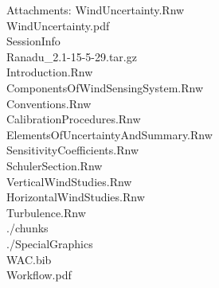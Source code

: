 \documentclass[12pt,twoside,english]{article}\usepackage[]{graphicx}\usepackage[]{color}
\newenvironment{lyxlist}[1]
{\begin{list}{}
{\settowidth{\labelwidth}{#1}
\setlength{\leftmargin}{\labelwidth}
\addtolength{\leftmargin}{\labelsep}
\renewcommand{\makelabel}[1]{##1\hfil}}}
{\end{list}}
\newcommand{\attachm}[1]{\begin{lyxlist}{Attachments:00}
\item [Attachments:] {#1}
\end{lyxlist}}
\providecommand{\DIFaddbegin}{} %
\providecommand{\DIFaddend}{} %
\providecommand{\DIFdelbegin}{} %
\providecommand{\DIFdelend}{} %
\begin{document}
\DIFdelbegin %
\DIFdelend \DIFaddbegin \attachm{WindUncertainty.Rnw\\WindUncertainty.pdf\\SessionInfo\\Ranadu\_2.1-15-5-29.tar.gz\\Introduction.Rnw\\ComponentsOfWindSensingSystem.Rnw\\Conventions.Rnw\\CalibrationProcedures.Rnw\\ElementsOfUncertaintyAndSummary.Rnw\\SensitivityCoefficients.Rnw\\SchulerSection.Rnw\\VerticalWindStudies.Rnw\\HorizontalWindStudies.Rnw\\Turbulence.Rnw\\./chunks\\./SpecialGraphics\\WAC.bib\\Workflow.pdf}
\DIFaddend 
\end{document}
